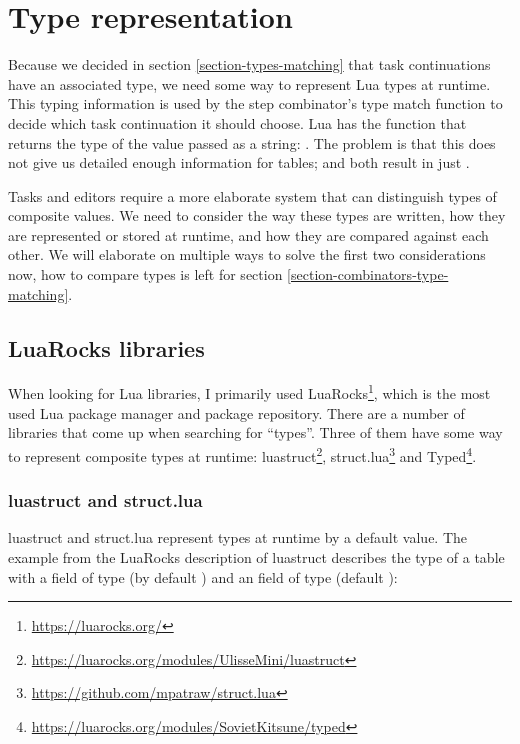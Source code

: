 \section{Type representation}\label{section-type-representation}
Because we decided in section \ref{section-types-matching} that task continuations have an associated type, we need some way to represent Lua types at runtime. This typing information is used by the step combinator's type match function to decide which task continuation it should choose.
Lua has the  function that returns the type of the value passed as a string: . The problem is that this does not give us detailed enough information for tables;  and  both result in just .

Tasks and editors require a more elaborate system that can distinguish types of composite values. We need to consider the way these types are written, how they are represented or stored at runtime, and how they are compared against each other. We will elaborate on multiple ways to solve the first two considerations now, how to compare types is left for section \ref{section-combinators-type-matching}.

\subsection{LuaRocks libraries}\label{section-task-types-luarocks}
When looking for Lua libraries, I primarily used LuaRocks\footnote{\label{footnote-luarocks}\url{https://luarocks.org/}}, which is the most used Lua package manager and package repository. There are a number of libraries that come up when searching for ``types''. Three of them have some way to represent composite types at runtime:
luastruct\footnote{\label{footnote-luastruct}\url{https://luarocks.org/modules/UlisseMini/luastruct}},
struct.lua\footnote{\url{https://github.com/mpatraw/struct.lua}} and
Typed\footnote{\label{footnote-typed}\url{https://luarocks.org/modules/SovietKitsune/typed}}.

\subsubsection{luastruct and struct.lua}
luastruct and struct.lua represent types at runtime by a default value. The example from the LuaRocks description of luastruct describes the type of a table with a  field of type  (by default ) and an  field of type  (default ):

